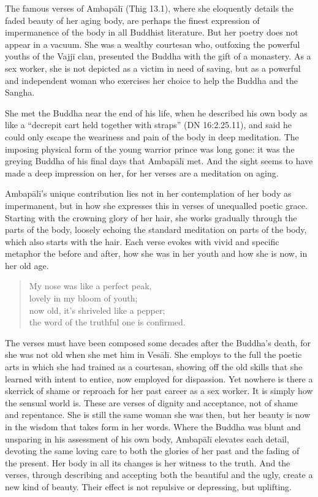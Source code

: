 \documentclass[12pt,openany]{book}%
\begin{document}
The famous verses of \textsanskrit{Ambapālī} (Thig 13.1), where she eloquently details the faded beauty of her aging body, are perhaps the finest expression of impermanence of the body in all Buddhist literature. But her poetry does not appear in a vacuum. She was a wealthy courtesan who, outfoxing the powerful youths of the \textsanskrit{Vajjī} clan, presented the Buddha with the gift of a monastery. As a sex worker, she is not depicted as a victim in need of saving, but as a powerful and independent woman who exercises her choice to help the Buddha and the Sangha. 

She met the Buddha near the end of his life, when he described his own body as like a “decrepit cart held together with straps” (DN 16:2.25.11), and said he could only escape the weariness and pain of the body in deep meditation. The imposing physical form of the young warrior prince was long gone: it was the greying Buddha of his final days that \textsanskrit{Ambapālī} met. And the sight seems to have made a deep impression on her, for her verses are a meditation on aging.

\textsanskrit{Ambapālī}’s unique contribution lies not in her contemplation of her body as impermanent, but in how she expresses this in verses of unequalled poetic grace. Starting with the crowning glory of her hair, she works gradually through the parts of the body, loosely echoing the standard meditation on parts of the body, which also starts with the hair. Each verse evokes with vivid and specific metaphor the before and after, how she was in her youth and how she is now, in her old age. 

\begin{quotation}%
My nose was like a perfect peak,\\

lovely in my bloom of youth;\\

now old, it’s shriveled like a pepper;\\

the word of the truthful one is confirmed.

%
\end{quotation}

The verses must have been composed some decades after the Buddha’s death, for she was not old when she met him in \textsanskrit{Vesālī}. She employs to the full the poetic arts in which she had trained as a courtesan, showing off the old skills that she learned with intent to entice, now employed for dispassion. Yet nowhere is there a skerrick of shame or reproach for her past career as a sex worker. It is simply how the sensual world is. These are verses of dignity and acceptance, not of shame and repentance. She is still the same woman she was then, but her beauty is now in the wisdom that takes form in her words. Where the Buddha was blunt and unsparing in his assessment of his own body, \textsanskrit{Ambapālī} elevates each detail, devoting the same loving care to both the glories of her past and the fading of the present. Her body in all its changes is her witness to the truth. And the verses, through describing and accepting both the beautiful and the ugly, create a new kind of beauty. Their effect is not repulsive or depressing, but uplifting.
\end{document}
